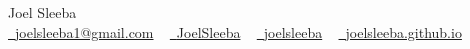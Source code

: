 \documentclass[letterpaper,11pt]{article}
\begin{document}

\begin{center}
    {\Huge Joel Sleeba} \\ \vspace{5pt}
    \small \href{mailto:joelsleeba1@gmail.com}{\raisebox{-0.2\height}\faEnvelope\  {joelsleeba1@gmail.com}} ~ 
    \href{https://twitter.com/JoelSleeba/}{\raisebox{-0.2\height}\faTwitter\ {JoelSleeba}}  ~
    \href{https://github.com/joelsleeba}{\raisebox{-0.2\height}\faGithub\ {joelsleeba}} ~
    \href{https://joelsleeba.github.io/}{\raisebox{-0.2\height}\faGlobe\ {joelsleeba.github.io}}

    \vspace{-5pt}
\end{center}



\end{document}
